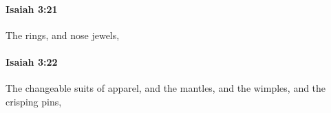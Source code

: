 		\paragraph{Isaiah 3:21} %
			\label{ISAIAH-3-21}

			The rings, and nose jewels,


		\paragraph{Isaiah 3:22} %
			\label{ISAIAH-3-22}

			The changeable suits of apparel, and the mantles, and the wimples, and the crisping pins,


